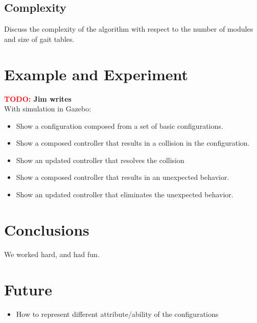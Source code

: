 \documentclass[conference]{IEEEtran}
\newcommand{\TODO}[1]{ {\bf \textcolor{red}{TODO:} #1 }}
\begin{document}
\subsection{Complexity}
Discuss the complexity of the algorithm with respect to the number of modules and size of gait tables.

\section{Example and Experiment}
\TODO{Jim writes}\\
With simulation in Gazebo:
\begin{itemize}
\item Show a configuration composed from a set of basic configurations.
\item Show a composed controller that results in a collision in the configuration.
\item Show an updated controller that resolves the collision
\item Show a composed controller that results in an unexpected behavior.
\item Show an updated controller that eliminates the unexpected behavior.
\end{itemize}

\section{Conclusions}
We worked hard, and had fun.

\section{Future}
\begin{itemize}
\item How to represent different attribute/ability of the configurations
\end{itemize}







\end{document}
